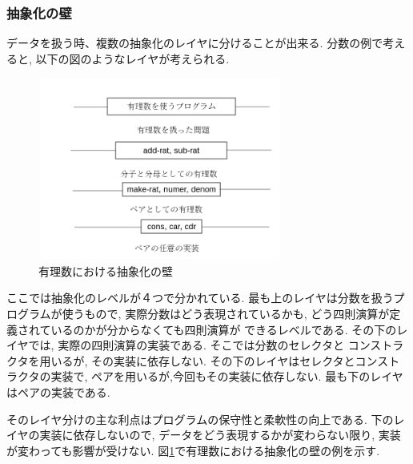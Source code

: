 \subsubsection{抽象化の壁}
データを扱う時、複数の抽象化のレイヤに分けることが出来る.
分数の例で考えると, 以下の図のようなレイヤが考えられる.
\begin{figure}[ht]
  \centering
  \includegraphics[width=8cm,height=6cm]{imgs/abstraction-barrier.png}
  \caption{\label{fig:abstraction-barrier}有理数における抽象化の壁}
\end{figure}

ここでは抽象化のレベルが４つで分かれている. 最も上のレイヤは分数を扱うプログラムが使うもので,
実際分数はどう表現されているかも, どう四則演算が定義されているのかが分からなくても四則演算が
できるレベルである. その下のレイヤでは, 実際の四則演算の実装である. そこでは分数のセレクタと
コンストラクタを用いるが, その実装に依存しない. その下のレイヤはセレクタとコンストラクタの実装で,
ペアを用いるが,今回もその実装に依存しない. 最も下のレイヤはペアの実装である.

そのレイヤ分けの主な利点はプログラムの保守性と柔軟性の向上である.
下のレイヤの実装に依存しないので, データをどう表現するかが変わらない限り,
実装が変わっても影響が受けない.
図\ref{fig:abstraction-barrier}で有理数における抽象化の壁の例を示す.
